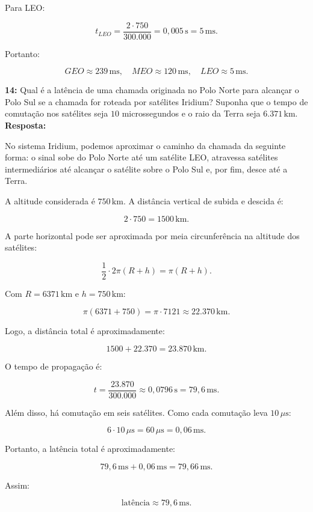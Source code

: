 \documentclass[12pt,a4paper]{report}
\begin{document}
Para LEO:

\[
t_{LEO} = \frac{2 \cdot 750}{300.000} = 0{,}005\,\text{s} = 5\,\text{ms}.
\]

Portanto:

\[
\boxed{GEO \approx 239\,\text{ms}, \quad MEO \approx 120\,\text{ms}, \quad LEO \approx 5\,\text{ms}.}
\]


\vspace{0.6cm}

\noindent \textbf{14:} Qual é a latência de uma chamada originada no Polo Norte para alcançar o Polo Sul se a chamada for roteada por satélites Iridium? Suponha que o tempo de comutação nos satélites seja $10$ microssegundos e o raio da Terra seja $6.371\,\text{km}$.\\
\textbf{Resposta:}

No sistema Iridium, podemos aproximar o caminho da chamada da seguinte forma: o sinal sobe do Polo Norte até um satélite LEO, atravessa satélites intermediários até alcançar o satélite sobre o Polo Sul e, por fim, desce até a Terra.

A altitude considerada é $750\,\text{km}$. A distância vertical de subida e descida é:

\[
2 \cdot 750 = 1500\,\text{km}.
\]

A parte horizontal pode ser aproximada por meia circunferência na altitude dos satélites:

\[
\frac{1}{2} \cdot 2\pi(R+h) = \pi(R+h).
\]

Com $R = 6371\,\text{km}$ e $h = 750\,\text{km}$:

\[
\pi(6371+750) = \pi \cdot 7121 \approx 22.370\,\text{km}.
\]

Logo, a distância total é aproximadamente:

\[
1500 + 22.370 = 23.870\,\text{km}.
\]

O tempo de propagação é:

\[
t = \frac{23.870}{300.000} \approx 0{,}0796\,\text{s} = 79{,}6\,\text{ms}.
\]

Além disso, há comutação em seis satélites. Como cada comutação leva $10\,\mu\text{s}$:

\[
6 \cdot 10\,\mu\text{s} = 60\,\mu\text{s} = 0{,}06\,\text{ms}.
\]

Portanto, a latência total é aproximadamente:

\[
79{,}6\,\text{ms} + 0{,}06\,\text{ms} = 79{,}66\,\text{ms}.
\]

Assim:

\[
\boxed{\text{latência} \approx 79{,}6\,\text{ms}}.
\]
\end{document}
